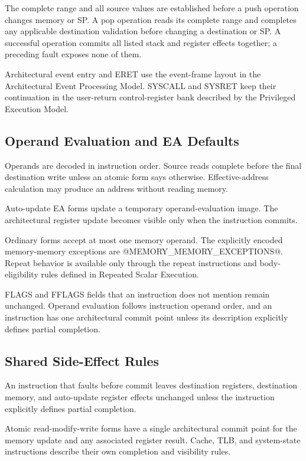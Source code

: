 The complete range and all source values are established before a push operation changes memory or SP. A pop
operation reads its complete range and completes any applicable destination validation before changing a destination
or SP. A successful operation commits all listed stack and register effects together; a preceding fault exposes none
of them.

Architectural event entry and ERET use the event-frame layout in the Architectural Event Processing Model.
SYSCALL and SYSRET keep their continuation in the user-return control-register bank described by the Privileged
Execution Model.

\subsection{Operand Evaluation and EA Defaults}
Operands are decoded in instruction order. Source reads complete before the final destination write unless an
atomic form says otherwise. Effective-address calculation may produce an address without reading memory.

Auto-update EA forms update a temporary operand-evaluation image. The architectural register update becomes
visible only when the instruction commits.

Ordinary forms accept at most one memory operand. The explicitly encoded memory-memory exceptions are
@MEMORY_MEMORY_EXCEPTIONS@. Repeat behavior is available only through the repeat instructions and body-eligibility
rules defined in Repeated Scalar Execution.

FLAGS and FFLAGS fields that an instruction does not mention remain unchanged. Operand evaluation follows
instruction operand order, and an instruction has one architectural commit point unless its description explicitly
defines partial completion.

\subsection{Shared Side-Effect Rules}
An instruction that faults before commit leaves destination registers, destination memory, and auto-update
register effects unchanged unless the instruction explicitly defines partial completion.

Atomic read-modify-write forms have a single architectural commit point for the memory update and any associated
register result. Cache, TLB, and system-state instructions describe their own completion and visibility rules.

